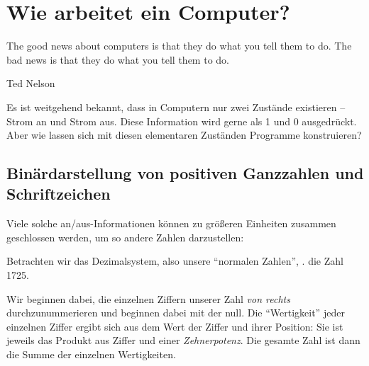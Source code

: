 \chapter{Wie arbeitet ein Computer?}
\epigraph{The good news about computers is that they do what you tell them to do. The bad news is that they do what you tell them to do.}{Ted Nelson}

Es ist weitgehend bekannt, dass in Computern nur zwei Zustände existieren -- Strom an und Strom aus. Diese Information wird gerne als 1 und 0 ausgedrückt. Aber wie lassen sich mit diesen elementaren Zuständen Programme konstruieren?

\section{Binärdarstellung von positiven Ganzzahlen und Schriftzeichen}\label{sec:BinaryNumbers}
Viele solche an/aus-Informationen können zu größeren Einheiten zusammen geschlossen werden, um so andere Zahlen darzustellen:

Betrachten wir das Dezimalsystem, also unsere \enquote{normalen Zahlen}, \eg. die Zahl 1725.
\begin{tcolorbox}
	[title=Zerlegung einer Dezimalzahl,
	 arc=0pt,
	 outer arc=0pt
	]
\begin{center}
\end{center}
\end{tcolorbox}

Wir beginnen dabei, die einzelnen Ziffern unserer Zahl \emph{von rechts} durchzunummerieren und beginnen dabei mit der null. Die \enquote{Wertigkeit} jeder einzelnen Ziffer ergibt sich aus dem Wert der Ziffer und ihrer Position: Sie ist jeweils das Produkt aus Ziffer und einer \emph{Zehnerpotenz}. Die gesamte Zahl ist dann die Summe der einzelnen Wertigkeiten.

